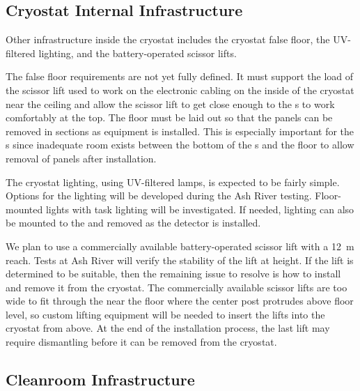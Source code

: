 \subsection{Cryostat Internal Infrastructure}
\label{sec:fdsp-tc-infr-cryo-int}



Other infrastructure inside the cryostat includes the cryostat false floor, the UV-filtered lighting, and the battery-operated scissor lifts. 

The false floor requirements are not yet fully defined.  
It must support the load of the scissor lift used to work on the electronic cabling on the inside of the cryostat near the ceiling and allow the scissor lift to get close enough to the s to work comfortably at the top. 
The floor  must be laid out so that the panels can be removed in sections %
as equipment is installed. 
This is especially important for the s %
since inadequate room exists between the bottom of the s and the floor to allow removal of panels after installation. 

The cryostat lighting, using UV-filtered  lamps, is expected to be fairly simple. Options for the lighting will be developed during the Ash River testing.
Floor-mounted lights with task lighting will be investigated. If needed, lighting can also be mounted to the  and removed as the detector is installed.

We plan to use a commercially available battery-operated scissor lift with a \SI{12}{m} reach. Tests at Ash River will verify the stability of the lift at height. If the lift is determined to be suitable, then the remaining issue to resolve is how to install and remove it from the cryostat. 
The commercially available scissor lifts are too wide to fit through the  near the floor where the center post  protrudes above floor level, so 
custom lifting equipment will be needed to insert the lifts into the cryostat from above. 
At the end of the installation process, the last lift may require dismantling before it can be removed from the cryostat.


\subsection{Cleanroom Infrastructure}
\label{sec:fdsp-tc-infr-comm}

